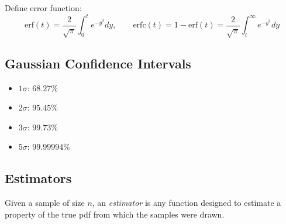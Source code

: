 Define error function:
\[
      \text{erf}(t) = \frac{2}{\sqrt{\pi}} \int_0^t e^{-y^2} dy,
      \qquad
      \text{erfc}(t) = 1 - \text{erf}(t) = \frac{2}{\sqrt{\pi}} \int_t^\infty e^{-y^2} dy
\]

\subsection{Gaussian Confidence Intervals}
\begin{itemize}
      \item $1\sigma$: $68.27\%$
      \item $2\sigma$: $95.45\%$
      \item $3\sigma$: $99.73\%$
      \item $5\sigma$: $99.99994\%$
\end{itemize}

\subsection{Estimators}
Given a sample of size $n$, an \emph{estimator} is any function designed to estimate a property of the true pdf from which the samples were drawn.

